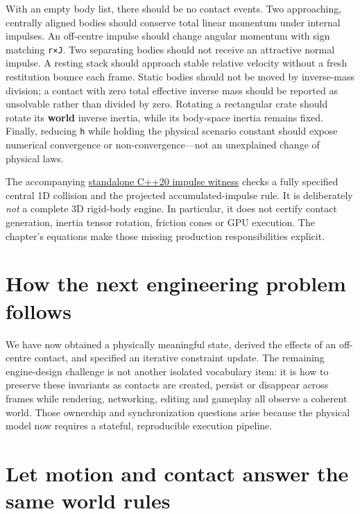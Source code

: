 With an empty body list, there should be no contact events. Two approaching, centrally aligned bodies should conserve total linear momentum under internal impulses. An off-centre impulse should change angular momentum with sign matching \texttt{r×J}. Two separating bodies should not receive an attractive normal impulse. A resting stack should approach stable relative velocity without a fresh restitution bounce each frame. Static bodies should not be moved by inverse-mass division; a contact with zero total effective inverse mass should be reported as unsolvable rather than divided by zero. Rotating a rectangular crate should rotate its \textbf{world} inverse inertia, while its body-space inertia remains fixed. Finally, reducing \texttt{h} while holding the physical scenario constant should expose numerical convergence or non-convergence---not an unexplained change of physical laws.

The accompanying \hyperref[source-file-128143bcbfc7213e97eaefa4]{standalone C++20 impulse witness} checks a fully specified central 1D collision and the projected accumulated-impulse rule. It is deliberately \emph{not} a complete 3D rigid-body engine. In particular, it does not certify contact generation, inertia tensor rotation, friction cones or GPU execution. The chapter's equations make those missing production responsibilities explicit.

\section{How the next engineering problem follows}\label{06-engine-ii-ch033-how-the-next-engineering-problem-follows}

We have now obtained a physically meaningful state, derived the effects of an off-centre contact, and specified an iterative constraint update. The remaining engine-design challenge is not another isolated vocabulary item: it is how to preserve these invariants as contacts are created, persist or disappear across frames while rendering, networking, editing and gameplay all observe a coherent world. Those ownership and synchronization questions arise because the physical model now requires a stateful, reproducible execution pipeline.

\section{Let motion and contact answer the same world rules}\label{06-engine-ii-ch033-let-motion-and-contact-answer-the-same-world-rules}

